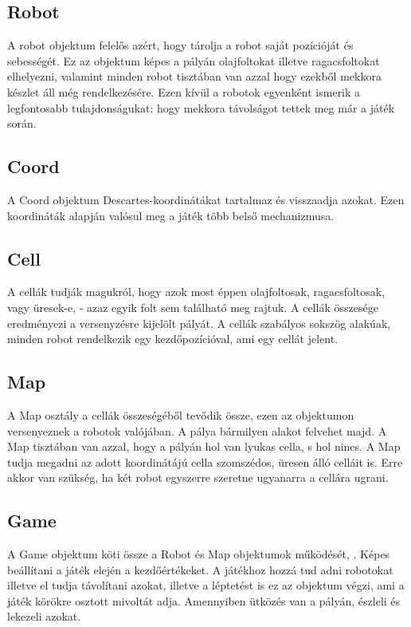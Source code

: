 
\subsection{Robot}

A robot objektum felelős azért, hogy tárolja a robot saját pozícióját és sebességét. Ez az objektum képes a pályán olajfoltokat illetve ragacsfoltokat elhelyezni, valamint minden robot tisztában van azzal hogy ezekből mekkora készlet áll még rendelkezésére. Ezen kívül a robotok egyenként ismerik a legfontosabb tulajdonságukat: hogy mekkora távolságot tettek meg már a játék során.

\subsection{Coord}

A Coord objektum Descartes-koordinátákat tartalmaz és visszaadja azokat. Ezen koordináták alapján valósul meg a játék több belső mechanizmusa.

\subsection{Cell}

A cellák tudják magukról, hogy azok most éppen olajfoltosak, ragacsfoltosak, vagy üresek-e, - azaz egyik folt sem található meg rajtuk. A cellák összesége eredményezi a versenyzésre kijelölt pályát. A cellák szabályos sokszög alakúak, minden robot rendelkezik egy kezdőpozícióval, ami egy cellát jelent.

\subsection{Map}

A Map osztály a cellák összeségéből tevődik össze, ezen az objektumon versenyeznek a robotok valójában. A pálya bármilyen alakot felvehet majd. A Map tisztában van azzal, hogy a pályán hol van lyukas cella, s hol nincs. A Map tudja megadni az adott koordinátájú cella szomszédos, üresen álló celláit is. Erre akkor van szükség, ha két robot egyszerre szeretne ugyanarra a cellára ugrani.

\subsection{Game}

A Game objektum köti össze a Robot és Map objektumok működését, . Képes beállítani a játék elején a kezdőértékeket. A játékhoz hozzá tud adni robotokat illetve el tudja távolítani azokat, illetve a léptetést is ez az objektum végzi, ami a játék körökre osztott mivoltát adja. Amennyiben ütközés van a pályán, észleli és lekezeli azokat. 